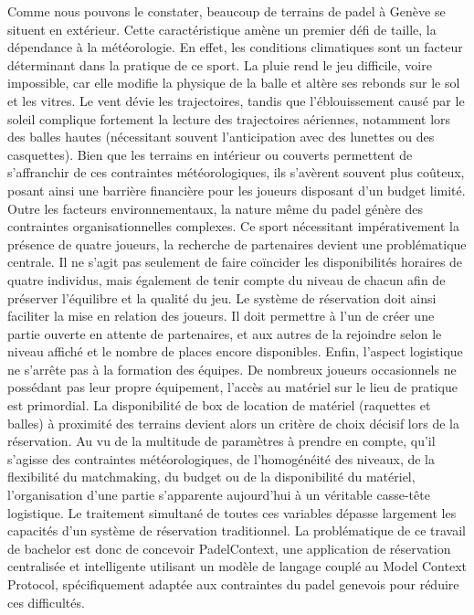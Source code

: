\documentclass[12pt]{article}
\begin{document}
\newline
Comme nous pouvons le constater, beaucoup de terrains de padel à Genève se situent en extérieur. Cette caractéristique amène un premier défi de taille, la dépendance à la météorologie. En effet, les conditions climatiques sont un facteur déterminant dans la pratique de ce sport. La pluie rend le jeu difficile, voire impossible, car elle modifie la physique de la balle et altère ses rebonds sur le sol et les vitres. Le vent dévie les trajectoires, tandis que l'éblouissement causé par le soleil complique fortement la lecture des trajectoires aériennes, notamment lors des balles hautes (nécessitant souvent l'anticipation avec des lunettes ou des casquettes).
\newline\newline
Bien que les terrains en intérieur ou couverts permettent de s'affranchir de ces contraintes météorologiques, ils s'avèrent souvent plus coûteux, posant ainsi une barrière financière pour les joueurs disposant d'un budget limité.
\newline\newline
Outre les facteurs environnementaux, la nature même du padel génère des contraintes organisationnelles complexes. Ce sport nécessitant impérativement la présence de quatre joueurs, la recherche de partenaires devient une problématique centrale. Il ne s'agit pas seulement de faire coïncider les disponibilités horaires de quatre individus, mais également de tenir compte du niveau de chacun afin de préserver l'équilibre et la qualité du jeu. Le système de réservation doit ainsi faciliter la mise en relation des joueurs. Il doit permettre à l'un de créer une partie ouverte en attente de partenaires, et aux autres de la rejoindre selon le niveau affiché et le nombre de places encore disponibles.
\newline\newline
Enfin, l'aspect logistique ne s'arrête pas à la formation des équipes. De nombreux joueurs occasionnels ne possédant pas leur propre équipement, l'accès au matériel sur le lieu de pratique est primordial. La disponibilité de box de location de matériel (raquettes et balles) à proximité des terrains devient alors un critère de choix décisif lors de la réservation.
\newline\newline
Au vu de la multitude de paramètres à prendre en compte, qu'il s'agisse des contraintes météorologiques, de l'homogénéité des niveaux, de la flexibilité du matchmaking, du budget ou de la disponibilité du matériel, l'organisation d'une partie s'apparente aujourd'hui à un véritable casse-tête logistique. Le traitement simultané de toutes ces variables dépasse largement les capacités d'un système de réservation traditionnel. La problématique de ce travail de bachelor est donc de concevoir PadelContext, une application de réservation centralisée et intelligente utilisant un modèle de langage couplé au Model Context Protocol, spécifiquement adaptée aux contraintes du padel genevois pour réduire ces difficultés.
\end{document}

